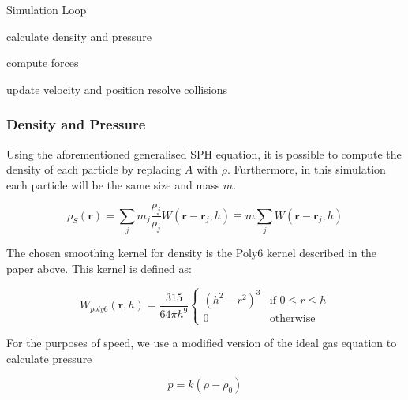 \documentclass[12pt]{article}
\begin{document}
    \begin{algorithm}
        \caption{Simulation Loop}

        \begin{algorithmic}[1]
                \State calculate density and pressure
            \EndFor

                \State compute forces
            \EndFor

                \State update velocity and position
                \State resolve collisions
            \EndFor
        \end{algorithmic}

    \end{algorithm}

    \subsubsection{Density and Pressure}

    Using the aforementioned generalised SPH equation, it is possible to compute the density of each particle by replacing $A$ with $\rho$. Furthermore, in this simulation each particle will be the same size and mass $m$.

    \begin{equation}
        \rho_S(\textbf{r}) = \sum_{j}{m_j \frac{\rho_j}{\rho_j}W(\textbf{r} - \textbf{r}_j, h)} \equiv m\sum_{j}{W(\textbf{r} - \textbf{r}_j, h)}
    \end{equation}

    The chosen smoothing kernel for density is the Poly6 kernel described in the paper above\cite{sca}. This kernel is defined as:

    \begin{equation}
        W_{poly6}(\textbf{r}, h) = \frac{315}{64\pi{h}^9}
        \begin{cases}
            (h^2 - r^2)^3 & \text{if } 0 \leq r \leq h \\
            0 & \text{otherwise}
        \end{cases}
    \end{equation}

    For the purposes of speed, we use a modified version of the ideal gas equation to calculate pressure

    \begin{equation}
        p = k(\rho - \rho_0)
    \end{equation}
\end{document}
